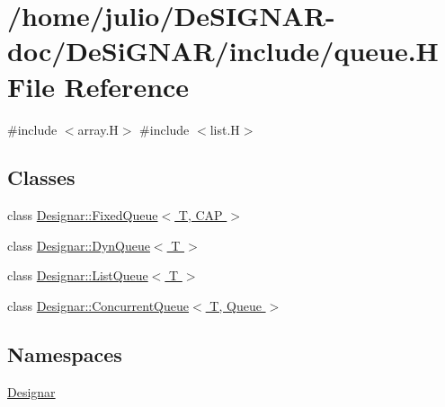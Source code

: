 \hypertarget{queue_8_h}{}\section{/home/julio/\+De\+S\+I\+G\+N\+A\+R-\/doc/\+De\+Si\+G\+N\+A\+R/include/queue.H File Reference}
\label{queue_8_h}
{\ttfamily \#include $<$array.\+H$>$}\newline
{\ttfamily \#include $<$list.\+H$>$}\newline
\subsection*{Classes}
\begin{DoxyCompactItemize}
\item 
class \hyperlink{class_designar_1_1_fixed_queue}{Designar\+::\+Fixed\+Queue$<$ T, C\+A\+P $>$}
\item 
class \hyperlink{class_designar_1_1_dyn_queue}{Designar\+::\+Dyn\+Queue$<$ T $>$}
\item 
class \hyperlink{class_designar_1_1_list_queue}{Designar\+::\+List\+Queue$<$ T $>$}
\item 
class \hyperlink{class_designar_1_1_concurrent_queue}{Designar\+::\+Concurrent\+Queue$<$ T, Queue $>$}
\end{DoxyCompactItemize}
\subsection*{Namespaces}
\begin{DoxyCompactItemize}
\item 
 \hyperlink{namespace_designar}{Designar}
\end{DoxyCompactItemize}
